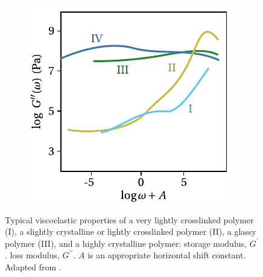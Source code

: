 \begin{figure}[hbtp]
\begin{subfigure}[b]{0.45\textwidth}
                        \includegraphics[width=\textwidth]{figures/loss_modulus_scp}
                        \caption{}
                        \label{subfig:loss_modulus_scp}
        \end{subfigure}
    \caption{Typical viscoelastic properties of a very lightly crosslinked polymer (I), a slightly crystalline or lightly crosslinked polymer (II), a glassy polymer (III), and a highly crystalline polymer:  storage modulus, $G^\prime$.  loss modulus, $G^{\prime\prime}$. $A$ is an appropriate horizontal shift constant. Adapted from \cite{ferryViscoelasticPropertiesPolymers1980}.}
\label{fig:dma_scp}
\end{figure}

